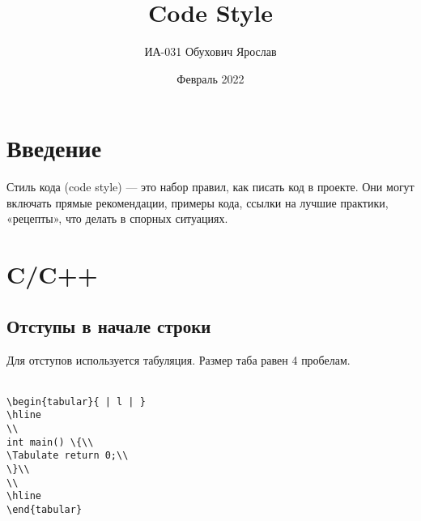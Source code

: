 \documentclass{article}
\title{Code Style}
\author{ИА-031 Обухович Ярослав}
\affil{email: yar.obuxowi42002@gmail.com,  github: @Digital1804}
\date{Февраль 2022}
\begin{document}
\maketitle

\section{Введение}
Стиль кода (code style) — это набор правил, как писать код в проекте. Они могут включать прямые рекомендации, примеры кода, ссылки на лучшие практики, «рецепты», что делать в спорных ситуациях. \cite{one}

\section{C/C++}
\subsection{Отступы в начале строки}

Для отступов используется табуляция. Размер таба равен 4 пробелам.\\\\
\newcommand*{\Tabulate}{\hspace*{0.5cm}}
\begin{lstlisting}
\begin{tabular}{ | l | }
\hline
\\
int main() \{\\
\Tabulate return 0;\\
\}\\
\\
\hline
\end{tabular}
\end{lstlisting}
\end{document}
